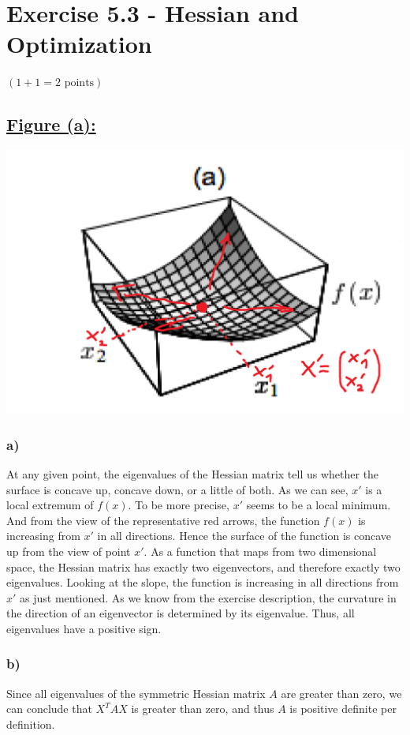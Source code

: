 \documentclass[a4paper]{article}
\begin{document}
\newpage
\section*{Exercise 5.3 - Hessian and Optimization}
$(1+1 = 2 \text{ points})$
    \subsection*{\underline{Figure (a):}}
        \includegraphics[width=0.8\linewidth]{Assignment 5/1.png}
        \subsubsection*{a)}
            At any given point, the eigenvalues of the Hessian matrix tell us whether the surface is concave up, concave down, or a little of both.
            As we can see, $x'$ is a local extremum of $f(x)$. To be more precise, $x'$ seems to be a local minimum.
            And from the view of the representative red arrows, the function $f(x)$ is increasing from $x'$ in all directions.
            Hence the surface of the function is concave up from the view of point $x'$.
            As a function that maps from two dimensional space, the Hessian matrix has exactly two eigenvectors, and therefore exactly two eigenvalues.
            Looking at the slope, the function is increasing in all directions from $x'$ as just mentioned.
            As we know from the exercise description, the curvature in the direction of an eigenvector is determined by its eigenvalue.
            Thus, all eigenvalues have a positive sign.

        \subsubsection*{b)}
            Since all eigenvalues of the symmetric Hessian matrix $A$ are greater than zero, we can conclude that $X^T A X$ is greater than zero, and thus $A$ is positive definite per definition.
\end{document}
